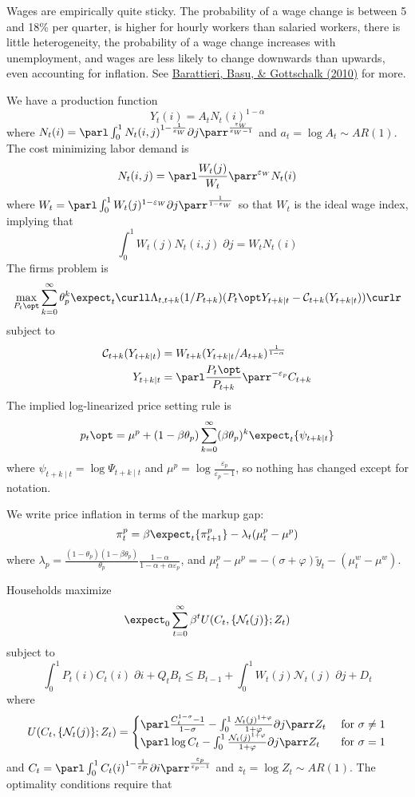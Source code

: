 \documentclass[10pt]{article}
\begin{document}
\begin{remark}
	Wages are empirically quite sticky. The probability of a wage change is between 5 and 18\% per quarter, is higher for hourly workers than salaried workers, there is little heterogeneity, the probability of a wage change increases with unemployment, and wages are less likely to change downwards than upwards, even accounting for inflation. See \href{https://www.nber.org/system/files/working_papers/w16130/w16130.pdf}{Barattieri, Basu, \& Gottschalk (2010)} for more. 
\end{remark}

\begin{model} 
	We have a production function \[Y_t(i) = A_t N_t(i)^{1-\alpha}\]where $N_t(i) = \parl \int_0^1 N_t(i,j)^{1-\frac{1}{\varepsilon_W}}\partial j\parr^{\frac{\varepsilon_W}{\varepsilon_W -1}}$ and $a_t = \log A_t \sim AR(1)$. The cost minimizing labor demand is \[N_t(i,j) = \parl \frac{W_t(j)}{W_t}\parr^{\varepsilon_W} N_t(i)\]where $W_t = \parl \int_0^1 W_t(j)^{1-\varepsilon_W}\partial j\parr^{\frac{1}{1-\varepsilon_W}}$ so that $W_t$ is the ideal wage index, implying that \[\int_0^1 W_t(j)N_t(i,j)\;\partial j = W_tN_t(i)\]The firms problem is\[\max_{P_t\opt} \sum_{k=0}^\infty \theta^k_p \expect_t\curll \Lambda_{t,t+k}(1 / P_{t+k})(P_t\opt Y_{t+k\mid t}-\mathcal{C}_{t+k}(Y_{t+k\mid t}))\curlr\]subject to\begin{align*} \mathcal{C}_{t+k}(Y_{t+k\mid t}) &= W_{t+k} (Y_{t+k\mid t}/A_{t+k})^{\frac{1}{1-\alpha}} \\ Y_{t+k\mid t} &= \parl \frac{P_t\opt}{P_{t+k}}\parr^{-\varepsilon_p}C_{t+k}\end{align*}The implied log-linearized price setting rule is \[p_t\opt = \mu^p + (1-\beta\theta_p)\sum_{k=0}^\infty (\beta\theta_p)^k \expect_t\{\psi_{t+k\mid t} \}\]where $\psi_{t+k\mid t} = \log \Psi_{t+k\mid t}$ and $\mu^p = \log \frac{\varepsilon_p}{\varepsilon_p-1}$, so nothing has changed except for notation.
	
	We write price inflation in terms of the markup gap:\[\pi_t^p = \beta \expect_t\{\pi_{t+1}^p\} -\lambda_t(\mu^p_t - \mu^p)\]where $\lambda_p = \frac{(1-\theta_p)(1-\beta\theta_p)}{\theta_p}\frac{1-\alpha}{1-\alpha+\alpha\varepsilon_p}$, and $\mu_t^p - \mu^p = -(\sigma+\varphi)\tilde{y}_t - (\mu_t^w - \mu^w)$. 
	
	Households maximize \[\expect_0 \sum_{t=0}^\infty \beta^t U(C_t,\{\mathcal{N}_t(j)\};Z_t)\]subject to \[\int_0^1 P_t(i)C_t(i)\;\partial i + Q_tB_t \le B_{t-1} + \int_0^1 W_t(j)\mathcal{N}_t(j)\;\partial j + D_t\]where\[U(C_t,\{\mathcal{N}_t(j)\};Z_t) = \begin{cases} \parl \frac{C_t^{1-\sigma}-1}{1-\sigma} - \int_0^1 \frac{\mathcal{N}_t(j)^{1+\varphi}}{1+\varphi}\partial j\parr Z_t & \text{ for } \sigma \ne 1 \\ \parl \log C_t - \int_0^1 \frac{\mathcal{N}_t(j)^{1+\varphi}}{1+\varphi}\partial j\parr Z_t & \text{ for } \sigma = 1\end{cases}\]and $C_t = \parl \int_0^1 C_t(i)^{1-\frac{1}{\varepsilon_P}}\partial i\parr^{\frac{\varepsilon_p}{\varepsilon_p-1}}$ and $z_t = \log Z_t \sim AR(1)$. The optimality conditions require that 
	

\end{model}
\end{document}
